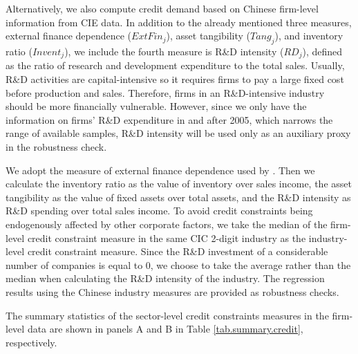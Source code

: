\documentclass[12pt]{article}
\begin{document}
Alternatively, we also compute credit demand based on Chinese firm-level information from CIE data. In addition to the already mentioned three measures, external finance dependence ($ExtFin_j$), asset tangibility ($Tang_j$), and inventory ratio ($Invent_j$), we include the fourth measure is R\&D intensity ($RD_j$), defined as the ratio of research and development expenditure to the total sales. Usually, R\&D activities are capital-intensive so it requires firms to pay a large fixed cost before production and sales. Therefore, firms in an R\&D-intensive industry should be more financially vulnerable. However, since we only have the information on firms' R\&D expenditure in and after 2005, which narrows the range of available samples, R\&D intensity will be used only as an auxiliary proxy in the robustness check. 

We adopt the measure of external finance dependence used by \cite{fan-lai-li2015}. Then we calculate the inventory ratio as the value of inventory over sales income, the asset tangibility as the value of fixed assets over total assets, and the R\&D intensity as R\&D spending over total sales income. To avoid credit constraints being endogenously affected by other corporate factors, we take the median of the firm-level credit constraint measure in the same CIC 2-digit industry as the industry-level credit constraint measure. Since the R\&D investment of a considerable number of companies is equal to 0, we choose to take the average rather than the median when calculating the R\&D intensity of the industry. The regression results using the Chinese industry measures are provided as robustness checks.

The summary statistics of the sector-level credit constraints measures in the firm-level data are shown in panels A and B in Table \ref{tab.summary.credit}, respectively.
\end{document}
